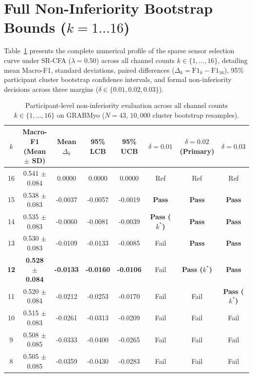 \documentclass[11pt,a4paper]{article}
\begin{document}
\section{Full Non-Inferiority Bootstrap Bounds (\texorpdfstring{$k=1\dots 16$}{k=1..16})}
\label{sec:supp_noninferiority}

Table~\ref{tab:supp_noninferiority} presents the complete numerical profile of the sparse sensor selection curve under SR-CFA ($\lambda=0.50$) across all channel counts $k \in \{1, \dots, 16\}$, detailing mean Macro-F1, standard deviations, paired differences ($\Delta_k = \text{F1}_k - \text{F1}_{16}$), 95\% participant cluster bootstrap confidence intervals, and formal non-inferiority decisions across three margins ($\delta \in \{0.01, 0.02, 0.03\}$).

\begin{table}[htbp]
\centering
\small
\setlength{\tabcolsep}{5.5pt}
\caption{Participant-level non-inferiority evaluation across all channel counts $k \in \{1, \dots, 16\}$ on GRABMyo ($N=43$, $10{,}000$ cluster bootstrap resamples).}
\label{tab:supp_noninferiority}
\begin{tabular}{cccccccc}
\toprule
\textbf{$k$} & \textbf{Macro-F1 (Mean $\pm$ SD)} & \textbf{Mean $\Delta_k$} & \textbf{95\% LCB} & \textbf{95\% UCB} & \textbf{$\delta=0.01$} & \textbf{$\delta=0.02$ (Primary)} & \textbf{$\delta=0.03$} \\
\midrule
16 & 0.541 $\pm$ 0.084 & 0.0000 & 0.0000 & 0.0000 & Ref & Ref & Ref \\
15 & 0.538 $\pm$ 0.083 & -0.0037 & -0.0057 & -0.0019 & \textbf{Pass} & \textbf{Pass} & \textbf{Pass} \\
14 & 0.535 $\pm$ 0.083 & -0.0060 & -0.0081 & -0.0039 & \textbf{Pass ($k^*$)} & \textbf{Pass} & \textbf{Pass} \\
13 & 0.530 $\pm$ 0.083 & -0.0109 & -0.0133 & -0.0085 & Fail & \textbf{Pass} & \textbf{Pass} \\
\textbf{12} & \textbf{0.528 $\pm$ 0.084} & \textbf{-0.0133} & \textbf{-0.0160} & \textbf{-0.0106} & Fail & \textbf{Pass ($k^*$)} & \textbf{Pass} \\
11 & 0.520 $\pm$ 0.084 & -0.0212 & -0.0253 & -0.0170 & Fail & Fail & \textbf{Pass ($k^*$)} \\
10 & 0.515 $\pm$ 0.083 & -0.0261 & -0.0313 & -0.0209 & Fail & Fail & Fail \\
9  & 0.508 $\pm$ 0.085 & -0.0333 & -0.0400 & -0.0265 & Fail & Fail & Fail \\
8  & 0.505 $\pm$ 0.085 & -0.0359 & -0.0430 & -0.0283 & Fail & Fail & Fail \\

\end{tabular}
\end{table}
\end{document}
